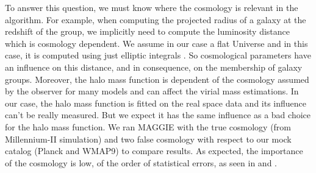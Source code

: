To answer this question, we must know where the cosmology is relevant in the
algorithm. For example, when computing the projected radius of a galaxy at the
redshift of the group, we implicitly need to compute the luminosity distance
which is cosmology dependent. We assume in our case a flat Universe and in this
case, it is computed using just elliptic integrals
\citep{Liu+11,Eisenstein+97}. So cosmological parameters have an influence on
this distance, and in consequence, on the membership of galaxy groups.
Moreover, the halo mass function is dependent of the cosmology assumed by the
observer for many models and can affect the virial mass estimations. In our
case, the halo mass function is fitted on the real space data and its influence
can't be really measured. But we expect it has the same influence as a bad
choice for the halo mass function. We ran MAGGIE with the true cosmology (from
Millennium-II simulation) and two false cosmology with respect to our mock
catalog (Planck and WMAP9) to compare results. As expected, the importance of
the cosmology is low, of the order of statistical errors, as seen in
 and .
%
